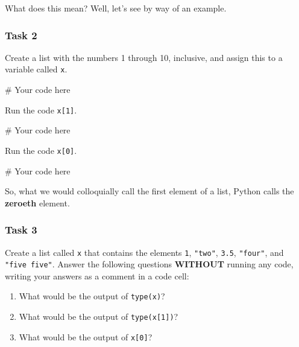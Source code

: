 \documentclass[
  11pt,
]{article}
\newenvironment{Shaded}{\begin{snugshade}}{\end{snugshade}}
\newcommand{\CommentTok}[1]{\textcolor[rgb]{0.37,0.37,0.37}{#1}}
\providecommand{\tightlist}{%
  \setlength{\itemsep}{0pt}\setlength{\parskip}{0pt}}\usepackage{longtable,booktabs,array}
\begin{document}
What does this mean? Well, let's see by way of an example.

\subsubsection{Task 2}\label{task-2}

Create a list with the numbers 1 through 10, inclusive, and assign this
to a variable called \texttt{x}.

\begin{Shaded}
\begin{Highlighting}[]
\CommentTok{\# Your code here}
\end{Highlighting}
\end{Shaded}

Run the code \texttt{x{[}1{]}}.

\begin{Shaded}
\begin{Highlighting}[]
\CommentTok{\# Your code here}
\end{Highlighting}
\end{Shaded}

Run the code \texttt{x{[}0{]}}.

\begin{Shaded}
\begin{Highlighting}[]
\CommentTok{\# Your code here}
\end{Highlighting}
\end{Shaded}

So, what we would colloquially call the first element of a list, Python
calls the \textbf{zeroeth} element.

\subsubsection{Task 3}\label{task-3}

Create a list called \texttt{x} that contains the elements \texttt{1},
\texttt{"two"}, \texttt{3.5}, \texttt{"four"}, and
\texttt{"five\ five"}. Answer the following questions \textbf{WITHOUT}
running any code, writing your answers as a comment in a code cell:

\begin{enumerate}
\def\labelenumi{\arabic{enumi}.}
\tightlist
\item
  What would be the output of \texttt{type(x)}?
\item
  What would be the output of \texttt{type(x{[}1{]})}?
\item
  What would be the output of \texttt{x{[}0{]}}?
\end{enumerate}
\end{document}
